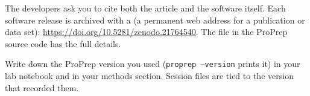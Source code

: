 The developers ask you to cite both the article and the software itself. Each
software release is archived with a  (a permanent web address for a
publication or data set): \url{https://doi.org/10.5281/zenodo.21764540}. The
file  in the ProPrep source code has the full details.

\begin{tip}
Write down the ProPrep version you used (\texttt{proprep --version} prints it)
in your lab notebook and in your methods section. Session files are tied to the
version that recorded them.
\end{tip}
